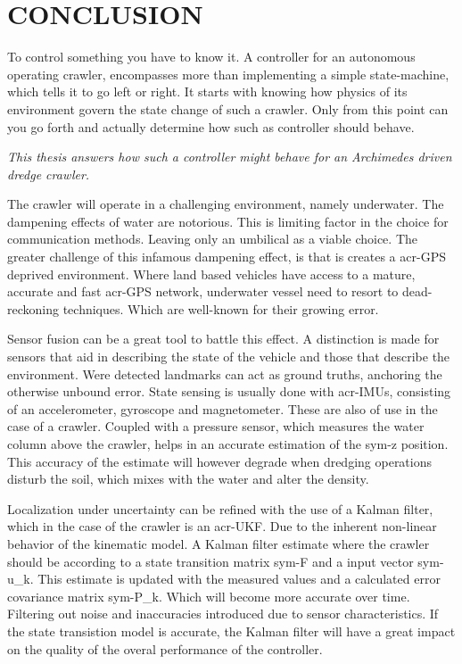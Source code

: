 
\chapter{CONCLUSION}\label{chap:conclusion}
\glsresetall

To control something you have to know it. A controller for an autonomous operating crawler, encompasses more than
implementing a simple state-machine, which tells it to go left or right. It starts with knowing how physics of its 
environment govern the state change of such a crawler. Only from this point can you go forth and actually determine how 
such as controller should behave.

\medskip
\noindent \textit{This thesis answers how such a controller might behave for an Archimedes driven dredge crawler.}
\medskip\newline

The crawler will operate in a challenging environment, namely underwater. The dampening effects of water are 
notorious. This is limiting factor in the choice for communication methods. Leaving only an umbilical as a viable 
choice. The greater challenge of this infamous dampening effect, is that is creates a \gls{acr-GPS} deprived 
environment. Where land based vehicles have access to a mature, accurate and fast \gls{acr-GPS} network, underwater 
vessel need to resort to dead-reckoning techniques. Which are well-known for their growing error.

Sensor fusion can be a great tool to battle this effect. A distinction is made for sensors that aid in describing the 
state of the vehicle and those that describe the environment. Were detected landmarks can act as ground truths, 
anchoring the otherwise unbound error. State sensing is usually done with \glspl{acr-IMU}, consisting of an 
accelerometer, gyroscope and magnetometer. These are also of use in the case of a crawler. Coupled with a pressure 
sensor, which measures the water column above the crawler, helps in an accurate estimation of the \gls{sym-z} 
position. This accuracy of the estimate will however degrade when dredging operations disturb the soil, which mixes 
with the water and alter the density.

Localization under uncertainty can be refined with the use of a Kalman filter, which in the case of the crawler is an
\gls{acr-UKF}. Due to the inherent non-linear behavior of the kinematic model. A Kalman filter estimate where the
crawler should be according to a state transition matrix \gls{sym-F} and a input vector \gls{sym-u_k}. This estimate 
is updated with the measured values and a calculated error covariance matrix \gls{sym-P_k}. Which will become more 
accurate over time. Filtering out noise and inaccuracies introduced due to sensor characteristics. If the state 
transistion model is accurate, the Kalman filter will have a great impact on the quality of the overal performance of
the controller.


